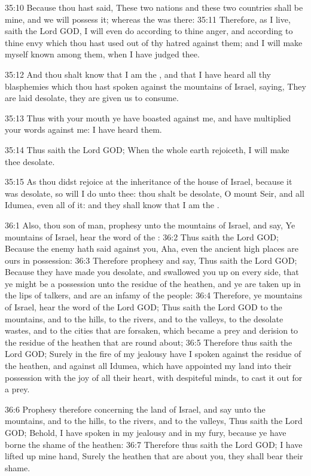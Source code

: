 35:10 Because thou hast said, These two nations and these two countries shall be mine, and we will possess it; whereas the \LORD was there: 35:11 Therefore, as I live, saith the Lord GOD, I will even do according to thine anger, and according to thine envy which thou hast used out of thy hatred against them; and I will make myself known among them, when I have judged thee.

35:12 And thou shalt know that I am the \LORD, and that I have heard all thy blasphemies which thou hast spoken against the mountains of Israel, saying, They are laid desolate, they are given us to consume.

35:13 Thus with your mouth ye have boasted against me, and have multiplied your words against me: I have heard them.

35:14 Thus saith the Lord GOD; When the whole earth rejoiceth, I will make thee desolate.

35:15 As thou didst rejoice at the inheritance of the house of Israel, because it was desolate, so will I do unto thee: thou shalt be desolate, O mount Seir, and all Idumea, even all of it: and they shall know that I am the \LORD.

36:1 Also, thou son of man, prophesy unto the mountains of Israel, and say, Ye mountains of Israel, hear the word of the \LORD: 36:2 Thus saith the Lord GOD; Because the enemy hath said against you, Aha, even the ancient high places are ours in possession: 36:3 Therefore prophesy and say, Thus saith the Lord GOD; Because they have made you desolate, and swallowed you up on every side, that ye might be a possession unto the residue of the heathen, and ye are taken up in the lips of talkers, and are an infamy of the people: 36:4 Therefore, ye mountains of Israel, hear the word of the Lord GOD; Thus saith the Lord GOD to the mountains, and to the hills, to the rivers, and to the valleys, to the desolate wastes, and to the cities that are forsaken, which became a prey and derision to the residue of the heathen that are round about; 36:5 Therefore thus saith the Lord GOD; Surely in the fire of my jealousy have I spoken against the residue of the heathen, and against all Idumea, which have appointed my land into their possession with the joy of all their heart, with despiteful minds, to cast it out for a prey.

36:6 Prophesy therefore concerning the land of Israel, and say unto the mountains, and to the hills, to the rivers, and to the valleys, Thus saith the Lord GOD; Behold, I have spoken in my jealousy and in my fury, because ye have borne the shame of the heathen: 36:7 Therefore thus saith the Lord GOD; I have lifted up mine hand, Surely the heathen that are about you, they shall bear their shame.

